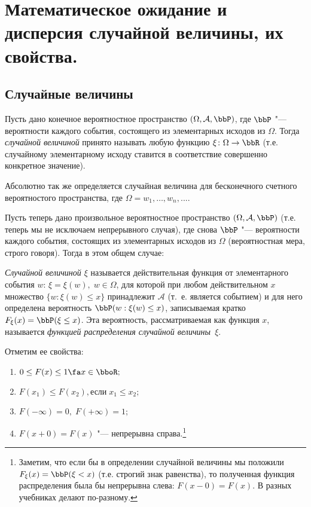 \chapter{Математическое ожидание и дисперсия случайной величины, их свойства.}
\section{Случайные величины}

Пусть дано конечное вероятностное пространство $(\Omega,\mathcal A, \bbP)$, где $\bbP$ "--- вероятности каждого события, состоящего из элементарных исходов из $\Omega$. Тогда \textit{случайной величиной} принято называть любую функцию $\xi\colon \Omega \to \bbR$ (т.е. случайному элементарному исходу ставится в соответствие совершенно конкретное значение).

Абсолютно так же определяется случайная величина для бесконечного счетного вероятностого пространства, где $\Omega = {w_1,\dots, w_n,...}$.

Пусть теперь дано произвольное вероятностное пространство $(\Omega,\mathcal A, \bbP)$ (т.е. теперь мы не исключаем непрерывного случая), где снова $\bbP$ "--- вероятности каждого события, состоящих из элементарных исходов из $\Omega$ (вероятностная мера, строго говоря). Тогда в этом общем случае:
\begin{defn}
\textit{Случайной величиной $\xi$} называется действительная функция от элементарного события $w$: $\xi = \xi(w), \; w\in\Omega$, для которой при любом действительном $x$ множество $\{w: \xi(w) \le x\}$ принадлежит $\mathcal A$ (т.~е. является событием) и для него определена вероятность $\bbP(w: \xi(w) \le x)$, записываемая кратко $F_\xi(x)=\bbP(\xi \le x)$. Эта вероятность, рассматриваемая как функция $x$, называется \textit{функцией распределения случайной величины~$\xi$}.
\end{defn}
Отметим ее свойства:
\begin{enumerate}
\item 
$0 \le F(x) \le 1 \fa x \in \bboR;$ 
\item
$F(x_1) \le F(x_2), \text{если}\; x_1\le x_2;$
\item
$F(-\infty)=0, \; F(+\infty)=1;$
\item
$F(x+0)=F(x)$ "--- непрерывна справа.\footnote{Заметим, что если бы в определении случайной величины мы положили $F_\xi(x)=\bbP(\xi < x)$ (т.е. строгий знак равенства), то полученная функция распределения была бы непрерывна слева: $F(x-0)=F(x)$. В разных учебниках делают по-разному.}
\end{enumerate}

